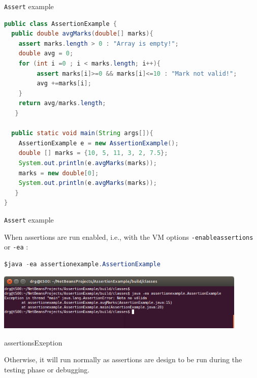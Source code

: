 \documentclass[11pt, xcolor=svgnames]{beamer}
\begin{document}

\begin{frame}[fragile]{\texttt{Assert} example}

\begin{lstlisting}[language=JAVA,basicstyle=\scriptsize]
public class AssertionExample {
  public double avgMarks(double[] marks){
   	assert marks.length > 0 : "Array is empty!";
   	double avg = 0;
   	for (int i =0 ; i < marks.length; i++){
   	     assert marks[i]>=0 && marks[i]<=10 : "Mark not valid!";
   	     avg +=marks[i];
   	}
   	return avg/marks.length;
   }

  public static void main(String args[]){
   	AssertionExample e = new AssertionExample();
   	double [] marks = {10, 5, 11, 3, 2, 7.5};
   	System.out.println(e.avgMarks(marks));
   	marks = new double[0];
   	System.out.println(e.avgMarks(marks));
   }
}

\end{lstlisting}


\end{frame}




\begin{frame}[fragile]{\texttt{Assert} example}

When assertions are run enabled, i.e., with the VM options \texttt{-enableassertions} or \texttt{-ea} :
\begin{lstlisting}[language=JAVA,basicstyle=\scriptsize]
$java -ea assertionexample.AssertionExample
\end{lstlisting}

\begin{center}
 \includegraphics[width=340pt]{./figs/assertionsExeption}
\end{center}

assertionsExeption 

Otherwise, it will run normally as assertions are design to be run during the testing phase or debugging.

\end{frame}
\end{document}
